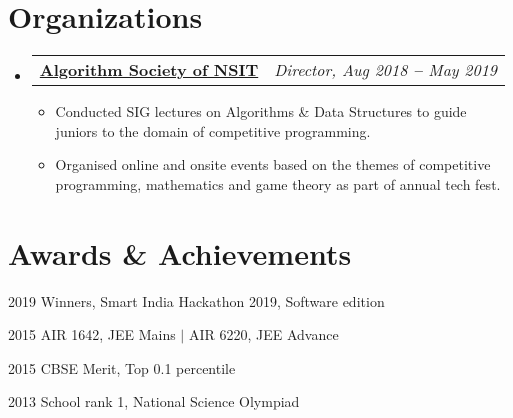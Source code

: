 \documentclass[letterpaper,11pt]{article}
\makeatletter
\newcommand{\resumeItem}[1]{
  \item\small{
    {#1 \vspace{-2pt}}
  }
}
\newcommand{\resumeOrganizationHeading}[2]{
  \vspace{-2pt}\item
    \begin{tabular*}{0.97\textwidth}[t]{l@{\extracolsep{\fill}}r}
      \textbf{#1} & \textit{\small #2} \\
    \end{tabular*}\vspace{-7pt}
}
\newcommand{\resumeSubHeadingListStart}{\begin{itemize}[leftmargin=0.15in, label={}]}
\newcommand{\resumeSubHeadingListEnd}{\end{itemize}}
\newcommand{\resumeItemListStart}{\begin{itemize}}
\newcommand{\resumeItemListEnd}{\end{itemize}\vspace{-5pt}}
\makeatother
\begin{document}

\section{Organizations}
\resumeSubHeadingListStart

\resumeOrganizationHeading
{\href{https://www.facebook.com/AlgorithmSocietyOfNSIT/}{Algorithm Society of NSIT}}
{Director, Aug 2018 \textbf{--} May 2019}
\resumeItemListStart
\resumeItem{Conducted SIG lectures on Algorithms \& Data Structures to guide juniors to the domain of competitive programming.}
\resumeItem{Organised online and onsite events based on the themes of competitive programming, mathematics and game theory as part of annual tech fest.}
\resumeItemListEnd

\resumeSubHeadingListEnd



\section{Awards \& Achievements}
\vspace{2pt}
\resumeSubHeadingListStart
\small{\item{
              2019 \hspace{10pt} Winners, Smart India Hackathon 2019, Software edition
              \\ \vspace{3pt}

              2015 \hspace{10pt} AIR 1642, JEE Mains $|$ AIR 6220, JEE Advance
              \\ \vspace{3pt}

              2015 \hspace{10pt} CBSE Merit, Top 0.1 percentile
              \\ \vspace{3pt}

              2013 \hspace{10pt} School rank 1, National Science Olympiad
              \\ \vspace{3pt}

        }}
\resumeSubHeadingListEnd


\end{document}
